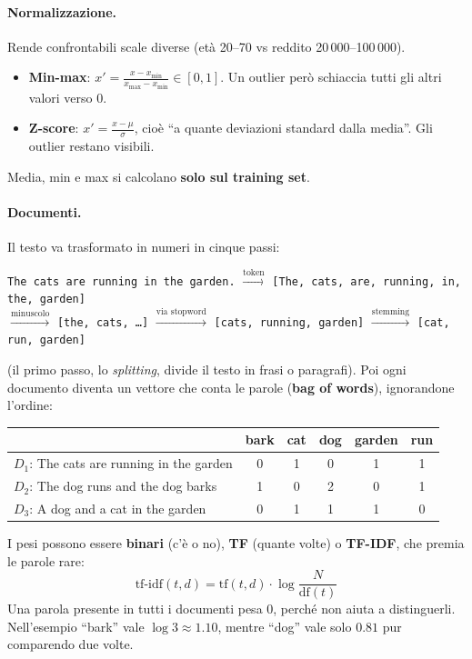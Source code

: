 \paragraph*{Normalizzazione.} Rende confrontabili scale diverse (età 20--70 vs reddito 20\,000--100\,000).
\begin{itemize}
    \item \textbf{Min-max}: $x'=\frac{x-x_{\min}}{x_{\max}-x_{\min}}\in[0,1]$. Un outlier però schiaccia tutti gli altri valori verso $0$.
    \item \textbf{Z-score}: $x'=\frac{x-\mu}{\sigma}$, cioè ``a quante deviazioni standard dalla media''. Gli outlier restano visibili.
\end{itemize}
Media, min e max si calcolano \textbf{solo sul training set}.

\paragraph*{Documenti.} Il testo va trasformato in numeri in cinque passi:
\begin{center}
    \small
    \texttt{The cats are running in the garden.}
    $\xrightarrow{\text{token}}$ \texttt{[The, cats, are, running, in, the, garden]}\\[2pt]
    $\xrightarrow{\text{minuscolo}}$ \texttt{[the, cats, \dots]}
    $\xrightarrow{\text{via stopword}}$ \texttt{[cats, running, garden]}
    $\xrightarrow{\text{stemming}}$ \texttt{[cat, run, garden]}
    \end{center}
    (il primo passo, lo \emph{splitting}, divide il testo in frasi o paragrafi). Poi ogni documento diventa un vettore che conta le parole (\textbf{bag of words}), ignorandone l'ordine:
    \begin{center}
    \small
    \begin{tabular}{@{}lccccc@{}}
    \toprule
    & bark & cat & dog & garden & run \\
    \midrule
    $D_1$: The cats are running in the garden & 0 & 1 & 0 & 1 & 1 \\
    $D_2$: The dog runs and the dog barks & 1 & 0 & 2 & 0 & 1 \\
    $D_3$: A dog and a cat in the garden & 0 & 1 & 1 & 1 & 0 \\
    \bottomrule
    \end{tabular}
\end{center}

I pesi possono essere \textbf{binari} (c'è o no), \textbf{TF} (quante volte) o \textbf{TF-IDF}, che premia le parole rare:
\[
\text{tf-idf}(t,d)=\text{tf}(t,d)\cdot\log\frac{N}{\text{df}(t)}
\]
Una parola presente in tutti i documenti pesa $0$, perché non aiuta a distinguerli. Nell'esempio ``bark'' vale $\log 3\approx1.10$, mentre ``dog'' vale solo $0.81$ pur comparendo due volte.